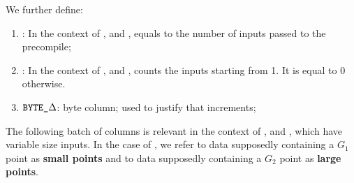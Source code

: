We further define:
\begin{enumerate}[resume]
    \item
        \totalInputs:
        In the context of ,  and , equals to the number of inputs passed to the precompile;
    \item
        \accInputs:
        In the context of ,  and , counts the inputs starting from 1. It is equal to 0 otherwise.
    \item
        $\texttt{BYTE}\texttt{\_$\Delta$}$:
        byte column; used to justify that \blsId{} increments;
\end{enumerate}
The following batch of columns is relevant in the context of ,  and , which have variable size inputs.
In the case of , we refer to data supposedly containing a $G_1$ point as \textbf{small points} and to data supposedly containing a $G_2$ point as \textbf{large points}.
